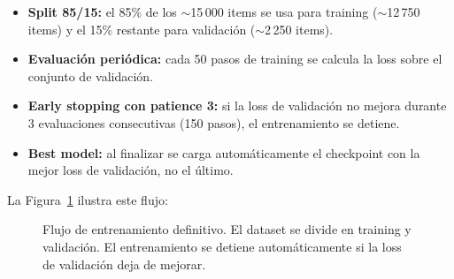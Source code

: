 \documentclass[11pt,a4paper]{article}
\begin{document}
\begin{itemize}
  \item \textbf{Split 85/15:} el 85\% de los $\sim$15\,000 items se usa
    para training ($\sim$12\,750 items) y el 15\% restante para
    validaci\'on ($\sim$2\,250 items).
  \item \textbf{Evaluaci\'on peri\'odica:} cada 50 pasos de training se
    calcula la loss sobre el conjunto de validaci\'on.
  \item \textbf{Early stopping con patience 3:} si la loss de
    validaci\'on no mejora durante 3 evaluaciones consecutivas (150
    pasos), el entrenamiento se detiene.
  \item \textbf{Best model:} al finalizar se carga autom\'aticamente el
    checkpoint con la mejor loss de validaci\'on, no el \'ultimo.
\end{itemize}

La Figura~\ref{fig:training-flow} ilustra este flujo:

\begin{figure}[H]
\centering
{}
\caption{Flujo de entrenamiento definitivo. El dataset se divide en
training y validaci\'on. El entrenamiento se detiene autom\'aticamente
si la loss de validaci\'on deja de mejorar.}
\label{fig:training-flow}
\end{figure}
\end{document}
